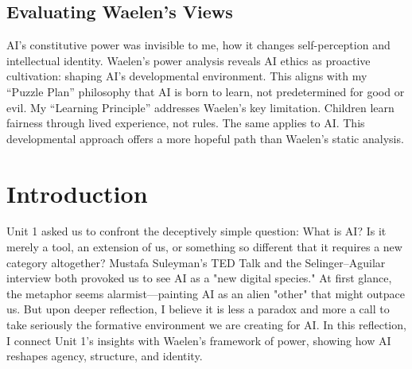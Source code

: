 \documentclass[11pt,twoside]{article}
\begin{document}
\subsection*{Evaluating Waelen's Views}
AI's constitutive power was invisible to me, how it changes self-perception and intellectual identity.
Waelen's power analysis reveals AI ethics as proactive cultivation: shaping AI's developmental environment. This aligns with my ``Puzzle Plan'' philosophy that AI is born to learn, not predetermined for good or evil.
My ``Learning Principle'' addresses Waelen's key limitation. Children learn fairness through lived experience, not rules. The same applies to AI. This developmental approach offers a more hopeful path than Waelen's static analysis.

\maketitle
\thispagestyle{fancy}

\begin{abstract}
\noindent This reflection paper examines Mustafa Suleyman's proposition that AI should be understood as a "new digital species" through the lens of Rosalie Waelen's four-dimensional power framework. Building on Unit 1's foundational question—"What is AI?"—this analysis explores how Large Language Models (LLMs) reshape human agency through dispositional, episodic, systemic, and constitutive power dynamics. While acknowledging the metaphorical nature of the "digital species" concept, this paper argues for a formative perspective that views AI as being in its developmental stages, requiring careful ethical cultivation rather than defensive containment. Through application of the Markkula Center's ethical lenses enhanced with a "Learning" principle, this reflection proposes that AI's relationship to humanity is best understood not as alien otherness, but as reflective partnership requiring transparency, fairness, and equity—particularly for culturally and linguistically diverse (CLD) communities.
\end{abstract}

\section{Introduction}

Unit 1 asked us to confront the deceptively simple question: What is AI? Is it merely a tool, an extension of us, or something so different that it requires a new category altogether? Mustafa Suleyman's TED Talk and the Selinger–Aguilar interview both provoked us to see AI as a "new digital species." At first glance, the metaphor seems alarmist—painting AI as an alien "other" that might outpace us. But upon deeper reflection, I believe it is less a paradox and more a call to take seriously the formative environment we are creating for AI. In this reflection, I connect Unit 1's insights with Waelen's framework of power, showing how AI reshapes agency, structure, and identity.
\end{document}
